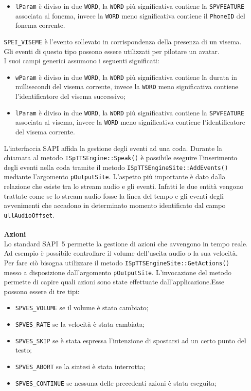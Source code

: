 \begin{description}
\begin{itemize}
			\item \texttt{lParam} è diviso in due \texttt{WORD}, la \texttt{WORD} più significativa contiene la \texttt{SPVFEATURE} associata al fonema, invece la \texttt{WORD} meno significativa contiene il \texttt{PhoneID} del fonema corrente.
		\end{itemize}
		\item [] \texttt{SPEI\_VISEME} è l'evento sollevato in corrispondenza della presenza di un visema. Gli eventi di questo tipo possono essere utilizzati per pilotare un avatar.\\
		I suoi campi generici assumono i seguenti significati:
		\begin{itemize}
			\item \texttt{wParam} è diviso in due \texttt{WORD}, la \texttt{WORD} più significativa contiene la durata in millisecondi del visema corrente, invece la \texttt{WORD} meno significativa contiene l'identificatore del visema successivo;
			\item \texttt{lParam} è diviso in due \texttt{WORD}, la \texttt{WORD} più significativa contiene la \texttt{SPVFEATURE} associata al visema, invece la \texttt{WORD} meno significativa contiene l'identificatore del visema corrente.
		\end{itemize}
	\end{description}
	L'interfaccia SAPI affida la gestione degli eventi ad una coda. Durante la chiamata al metodo \texttt{ISpTTSEngine::Speak()} è possibile eseguire l'inserimento degli eventi nella coda tramite il metodo \texttt{ISpTTSEngineSite::AddEvents()} mediante l'argomento \texttt{pOutputSite}.
	L'aspetto più importante è dato dalla relazione che esiste tra lo stream audio e gli eventi. Infatti le due entità vengono trattate come se lo stream audio fosse la linea del tempo e gli eventi degli avvenimenti che accadono in determinato momento identificato dal campo \texttt{ullAudioOffset}.
	\\\\
	\textbf{Azioni}\\
	Lo standard SAPI~5 permette la gestione di azioni che avvengono in tempo reale. Ad esempio è possibile controllare il volume dell'uscita audio o la sua velocità.
	Per fare ciò bisogna utilizzare il metodo \texttt{ISpTTSEngineSite::GetActions()} messo a disposizione dall'argomento \texttt{pOutputSite}.
	L'invocazione del metodo permette di capire quali azioni sono state effettuate dall'applicazione.Esse possono essere di tre tipi:
	\begin{itemize}
		\item \texttt{SPVES\_VOLUME} se il volume è stato cambiato;
		\item \texttt{SPVES\_RATE} se la velocità è stata cambiata;
		\item \texttt{SPVES\_SKIP} se è stata espressa l'intenzione di spostarsi ad un certo punto del testo;
		\item \texttt{SPVES\_ABORT} se la sintesi è stata interrotta;
		\item \texttt{SPVES\_CONTINUE} se nessuna delle precedenti azioni è stata eseguita;
	\end{itemize}
